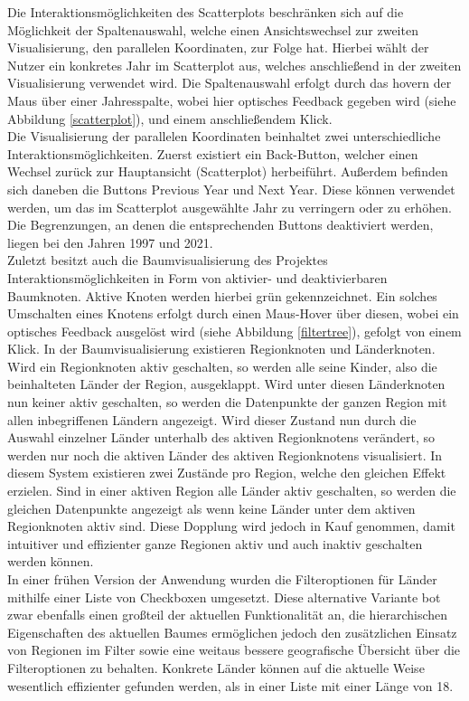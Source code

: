 \documentclass[usegeometry=true]{scrartcl}
\begin{document}
Die Interaktionsmöglichkeiten des Scatterplots beschränken sich auf die Möglichkeit der Spaltenauswahl, welche einen Ansichtswechsel zur zweiten Visualisierung, den parallelen Koordinaten, zur Folge hat. Hierbei wählt der Nutzer ein konkretes Jahr im Scatterplot aus, welches anschließend in der zweiten Visualisierung verwendet wird. Die Spaltenauswahl erfolgt durch das hovern der Maus über einer Jahresspalte, wobei hier optisches Feedback gegeben wird (siehe Abbildung \ref{scatterplot}), und einem anschließendem Klick.\\ Die Visualisierung der parallelen Koordinaten beinhaltet zwei unterschiedliche Interaktionsmöglichkeiten. Zuerst existiert ein \glqq Back\grqq-Button, welcher einen Wechsel zurück zur Hauptansicht (Scatterplot) herbeiführt. Außerdem befinden sich daneben die Buttons \glqq Previous Year\grqq{} und \glqq Next Year\grqq. Diese können verwendet werden, um das im Scatterplot ausgewählte Jahr zu verringern oder zu erhöhen. Die Begrenzungen, an denen die entsprechenden Buttons deaktiviert werden, liegen bei den Jahren 1997 und 2021.\\ Zuletzt besitzt auch die Baumvisualisierung des Projektes Interaktionsmöglichkeiten in Form von aktivier- und deaktivierbaren Baumknoten. Aktive Knoten werden hierbei grün gekennzeichnet. Ein solches Umschalten eines Knotens erfolgt durch einen Maus-Hover über diesen, wobei ein optisches Feedback ausgelöst wird (siehe Abbildung \ref{filtertree}), gefolgt von einem Klick. In der Baumvisualisierung existieren Regionknoten und Länderknoten. Wird ein Regionknoten aktiv geschalten, so werden alle seine Kinder, also die beinhalteten Länder der Region, \glqq ausgeklappt\grqq. Wird unter diesen Länderknoten nun keiner aktiv geschalten, so werden die Datenpunkte der ganzen Region mit allen inbegriffenen Ländern angezeigt. Wird dieser Zustand nun durch die Auswahl einzelner Länder unterhalb des aktiven Regionknotens verändert, so werden nur noch die aktiven Länder des aktiven Regionknotens visualisiert. In diesem System existieren zwei Zustände pro Region, welche den gleichen Effekt erzielen. Sind in einer aktiven Region alle Länder aktiv geschalten, so werden die gleichen Datenpunkte angezeigt als wenn keine Länder unter dem aktiven Regionknoten aktiv sind. Diese Dopplung wird jedoch in Kauf genommen, damit intuitiver und effizienter ganze Regionen aktiv und auch inaktiv geschalten werden können.\\ In einer frühen Version der Anwendung wurden die Filteroptionen für Länder mithilfe einer Liste von Checkboxen umgesetzt. Diese alternative Variante bot zwar ebenfalls einen großteil der aktuellen Funktionalität an, die hierarchischen Eigenschaften des aktuellen Baumes ermöglichen jedoch den zusätzlichen Einsatz von Regionen im Filter sowie eine weitaus bessere geografische Übersicht über die Filteroptionen zu behalten. Konkrete Länder können auf die aktuelle Weise wesentlich effizienter gefunden werden, als in einer Liste mit einer Länge von 18.\\
\end{document}
